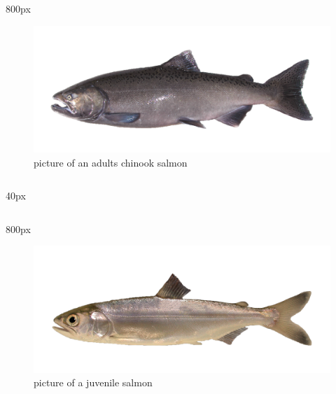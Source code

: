 \documentclass[
]{book}
\begin{document}
\begin{column}{800px\textwidth}
\begin{figure}

{\centering \includegraphics[width=29.17in]{figures/chinook_salmon} 

}

\caption{picture of an adults chinook salmon}\label{fig:unnamed-chunk-33}
\end{figure}
\end{column}

\begin{column}{40px\textwidth}
~
\end{column}

\begin{column}{800px\textwidth}
\begin{figure}

{\centering \includegraphics[width=29.17in]{figures/chinook_salmon_smolt} 

}

\caption{picture of a juvenile salmon}\label{fig:unnamed-chunk-34}
\end{figure}
\end{column}
\end{document}
